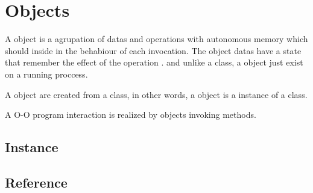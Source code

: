 \section{Objects}

A object is a agrupation 
of datas and operations 
with autonomous memory 
which should inside 
in the behabiour of each invocation. 
The object datas have a state that remember 
the effect of the 
operation \cite{Wegner:1987}.
and unlike a class, a object  
just exist on a running proccess.
 
A object are created from a 
class, in other words, 
a object is a instance of a class.


A O-O program interaction 
is realized by 
objects invoking methods. 

	\subsection{Instance}
	
	
	
	\subsection{Reference}
	
	
